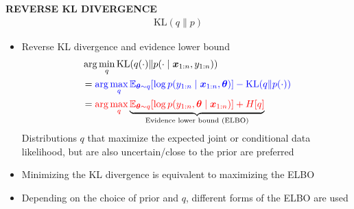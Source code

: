 \begin{whitebox}{\textbf{REVERSE KL DIVERGENCE}}
    \begin{align*}
        \mathrm{KL}(q\| p)
    \end{align*}
    \begin{itemize}
        \item Reverse KL divergence and evidence lower bound
        \begin{align*}
            &\arg\min_q\mathrm{KL}(q(\cdot)\|p(\cdot\mid \bm{x}_{1:n},y_{1:n}))\\
            &={\color{blue}\arg\max_q\mathbb{E}_{\bm{\theta}\sim q}[\log p(y_{1:n}\mid \bm{x}_{1:n},\bm{\theta})]-\mathrm{KL}(q\| p(\cdot))}\\
            &={\color{red}\arg\max_q}\underbrace{{\color{red}\mathbb{E}_{\bm{\theta}\sim q}[\log p(y_{1:n},\bm{\theta}\mid \bm{x}_{1:n})]+H[q]}}_{\text{Evidence lower bound (ELBO)}}
        \end{align*}
        Distributions $q$ that maximize the expected {\color{red}joint} or {\color{blue}conditional} data likelihood, but are also {\color{red}uncertain}/{\color{blue}close to the prior} are preferred
        \item Minimizing the KL divergence is equivalent to maximizing the ELBO
        \item Depending on the choice of prior and $q$, different forms of the ELBO are used
    \end{itemize}
\end{whitebox}

